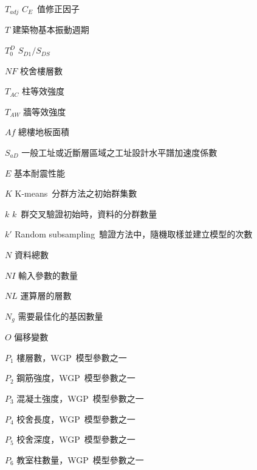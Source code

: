 \begin{SymEntry}
\item[$T_{adj}$]
$C_E$~值修正因子

\item[$T$]
建築物基本振動週期

\item[$T_0^D$]
$S_{D1}/S_{DS}$

\item[$NF$]
校舍樓層數

\item[$T_{AC}$]
柱等效強度

\item[$T_{AW}$]
牆等效強度

\item[$Af$]
總樓地板面積

\item[$S_{aD}$]
一般工址或近斷層區域之工址設計水平譜加速度係數

\item[$E$]
基本耐震性能

\item[$K$]
K-means~分群方法之初始群集數

\item[$k$]
$k$~群交叉驗證初始時，資料的分群數量

\item[$k'$]
Random subsampling~驗證方法中，隨機取樣並建立模型的次數

\item[$N$]
資料總數

\item[$NI$]
輸入參數的數量

\item[$NL$]
運算層的層數

\item[$N_g$]
需要最佳化的基因數量

\item[$O$]
偏移變數

\item[$P_1$]
樓層數，WGP~模型參數之一

\item[$P_2$]
鋼筋強度，WGP~模型參數之一

\item[$P_3$]
混凝土強度，WGP~模型參數之一

\item[$P_4$]
校舍長度，WGP~模型參數之一

\item[$P_5$]
校舍深度，WGP~模型參數之一

\item[$P_6$]
教室柱數量，WGP~模型參數之一


\end{SymEntry}
